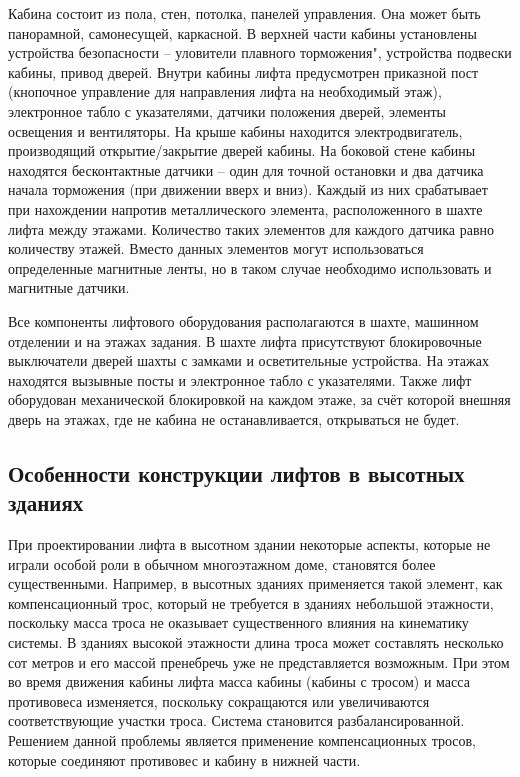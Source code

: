 		Кабина состоит из пола, стен, потолка, панелей управления. Она может быть панорамной,
			самонесущей, каркасной. В верхней части кабины установлены устройства безопасности
			-- уловители плавного торможения", устройства подвески кабины, привод дверей.
			Внутри кабины лифта предусмотрен приказной пост (кнопочное управление для
			направления лифта на необходимый этаж), электронное табло с указателями,
			датчики положения дверей, элементы освещения и вентиляторы.
			На крыше кабины находится электродвигатель, производящий открытие/закрытие дверей кабины.
			На боковой стене кабины находятся бесконтактные датчики – один для точной остановки
			и два датчика начала торможения (при движении вверх и вниз).
			Каждый из них срабатывает при нахождении напротив металлического элемента,
			расположенного в шахте лифта между этажами. Количество таких элементов для
			каждого датчика равно количеству этажей. Вместо данных элементов
			могут использоваться определенные магнитные ленты, но в таком случае
			необходимо использовать и магнитные датчики. 

		Все компоненты лифтового оборудования располагаются в шахте, машинном отделении и на этажах задания.
			В шахте лифта присутствуют блокировочные выключатели дверей шахты с замками и осветительные устройства.
			На этажах находятся вызывные посты и электронное табло с указателями.
			Также лифт оборудован механической блокировкой на каждом этаже,
			за счёт которой внешняя дверь на этажах, где не кабина не останавливается, открываться не будет. 

	\subsection{Особенности конструкции лифтов в высотных зданиях}

		При проектировании лифта в высотном здании некоторые аспекты,
			которые не играли особой роли в обычном многоэтажном доме, становятся более существенными.
			Например, в высотных зданиях применяется такой элемент, как компенсационный трос,
			который не требуется в зданиях небольшой этажности, поскольку масса троса не оказывает
			существенного влияния на кинематику системы. В зданиях высокой этажности длина троса может
			составлять несколько сот метров и его массой пренебречь уже не представляется возможным.
			При этом во время движения кабины лифта масса кабины (кабины с тросом) и масса противовеса изменяется,
			поскольку сокращаются или увеличиваются соответствующие участки троса.
			Система становится разбалансированной. Решением данной проблемы является применение
			компенсационных тросов, которые соединяют противовес и кабину в нижней части. 

